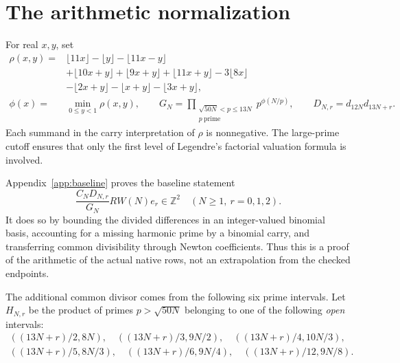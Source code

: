 \documentclass[11pt]{article}
\newcommand{\Z}{\mathbb Z}
\begin{document}
\section{The arithmetic normalization}
For real $x,y$, set
\[
\begin{split}
 \rho(x,y)={}&\lfloor11x\rfloor-\lfloor y\rfloor-\lfloor11x-y\rfloor\\
 &+\lfloor10x+y\rfloor+\lfloor9x+y\rfloor+\lfloor11x+y\rfloor
 -3\lfloor8x\rfloor\\
 &-\lfloor2x+y\rfloor-\lfloor x+y\rfloor-\lfloor3x+y\rfloor,\\
 \phi(x)={}&\min_{0\le y<1}\rho(x,y),\qquad
 G_N=\prod_{\substack{\sqrt{50N}<p\le13N\\p\ \text{prime}}}p^{\phi(N/p)},\qquad
 D_{N,r}=d_{12N}d_{13N+r}.
\end{split}
\]
Each summand in the carry interpretation of $\rho$ is nonnegative.
The large-prime cutoff ensures that only the first level of Legendre's
factorial valuation formula is involved.

Appendix~\ref{app:baseline} proves the baseline statement
\begin{equation}\label{eq:baseline}
 \frac{C_ND_{N,r}}{G_N}RW(N)e_r\in\Z^2
 \quad(N\ge1,\ r=0,1,2).
\end{equation}
It does so by bounding the divided differences in an integer-valued
binomial basis, accounting for a missing harmonic prime by a binomial
carry, and transferring common divisibility through Newton coefficients.
Thus this is a proof of the arithmetic of the actual native rows,
not an extrapolation from the checked endpoints.

The additional common divisor comes from the following six prime intervals.
Let $H_{N,r}$ be the product of primes $p>\sqrt{50N}$ belonging to
one of the following \emph{open} intervals:
\begin{equation}\label{eq:shells}
\begin{gathered}
 ((13N+r)/2,8N),\quad ((13N+r)/3,9N/2),\quad
 ((13N+r)/4,10N/3),\\
 ((13N+r)/5,8N/3),\quad ((13N+r)/6,9N/4),\quad
 ((13N+r)/12,9N/8).
\end{gathered}
\end{equation}
\end{document}
